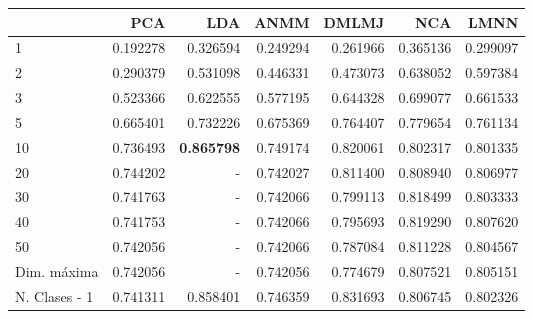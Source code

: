 \begin{tabular}{lrrrrrr}
\toprule
{} &       PCA &       LDA &      ANMM &     DMLMJ &       NCA &      LMNN \\
\midrule
1             &  0.192278 &  0.326594 &  0.249294 &  0.261966 &  0.365136 &  0.299097 \\
2             &  0.290379 &  0.531098 &  0.446331 &  0.473073 &  0.638052 &  0.597384 \\
3             &  0.523366 &  0.622555 &  0.577195 &  0.644328 &  0.699077 &  0.661533 \\
5             &  0.665401 &  0.732226 &  0.675369 &  0.764407 &  0.779654 &  0.761134 \\
10            &  0.736493 &  \textbf{0.865798} &  0.749174 &  0.820061 &  0.802317 &  0.801335 \\
20            &  0.744202 &  -        &  0.742027 &  0.811400 &  0.808940 &  0.806977 \\
30            &  0.741763 &  -        &  0.742066 &  0.799113 &  0.818499 &  0.803333 \\
40            &  0.741753 &  -        &  0.742066 &  0.795693 &  0.819290 &  0.807620 \\
50            &  0.742056 &  -        &  0.742066 &  0.787084 &  0.811228 &  0.804567 \\
Dim. máxima   &  0.742056 &  -        &  0.742056 &  0.774679 &  0.807521 &  0.805151 \\
N. Clases - 1 &  0.741311 &  0.858401 &  0.746359 &  0.831693 &  0.806745 &  0.802326 \\
\bottomrule
\end{tabular}
